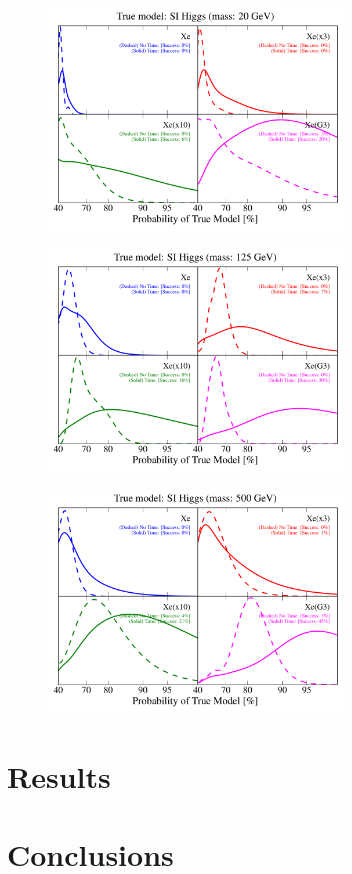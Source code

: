 \documentclass[11pt]{article}
\begin{document}
\begin{figure}
\centering
\includegraphics[width=0.7\textwidth]{plots/PDF_20GeV_SI_Higgs_50sims_Xe_Xe3x_Xe10x_XeG3_GF_TNT.pdf}
\caption{\label{fig:500gev_anapole_XeFull_TNT_GF}}
\end{figure}

\begin{figure}
\centering
\includegraphics[width=0.7\textwidth]{plots/PDF_125GeV_SI_Higgs_50sims_Xe_Xe3x_Xe10x_XeG3_GF_TNT.pdf}
\caption{\label{fig:500gev_anapole_XeFull_TNT_GF}}
\end{figure}

\begin{figure}
\centering
\includegraphics[width=0.7\textwidth]{plots/PDF_500GeV_SI_Higgs_50sims_Xe_Xe3x_Xe10x_XeG3_GF_TNT.pdf}
\caption{\label{fig:500gev_anapole_XeFull_TNT_GF}}
\end{figure}





\section{Results}

\section{Conclusions}





\end{document}
